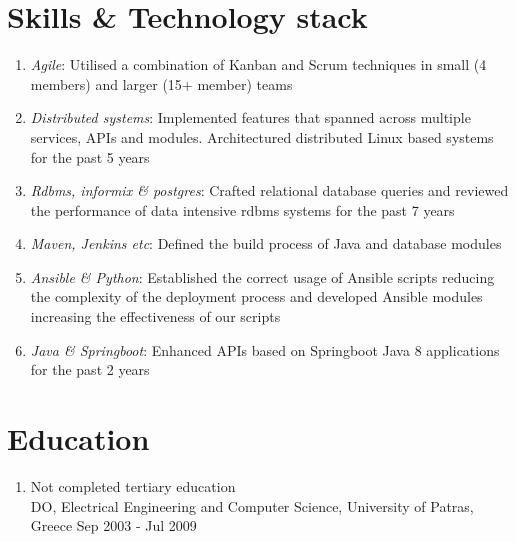 \documentclass{CVSoftwareEngineer}
\begin{document}
	\section{Skills \& Technology stack}
	\begin{enumerate}[labelwidth=!, labelindent=22pt, leftmargin=*, rightmargin=15pt]
		\item[\textasteriskcentered] \textit{Agile}: Utilised a combination of Kanban and Scrum techniques in small (4 members)
			and larger (15+ member) teams
		\item[\textasteriskcentered] \textit{Distributed systems}: Implemented features that spanned across multiple services,
			APIs and modules. Architectured distributed Linux based systems for the past 5 years
		\item[\textasteriskcentered] \textit{Rdbms, informix \& postgres}: Crafted relational database queries and reviewed
			the performance of data intensive rdbms systems for the past 7 years
		\item[\textasteriskcentered] \textit{Maven, Jenkins etc}: Defined the build process of Java and database modules
		\item[\textasteriskcentered] \textit{Ansible \& Python}: Established the correct usage of Ansible scripts reducing the complexity
			of the deployment process and developed Ansible modules increasing the effectiveness of our scripts
		\item[\textasteriskcentered] \textit{Java \& Springboot}: Enhanced APIs based on Springboot Java 8 applications for the past 2 years
	\end{enumerate}

	\section{Education}
	\begin{enumerate}[labelwidth=!, labelindent=0pt, leftmargin=*, rightmargin=15pt]
		\item[] Not completed tertiary education \\
			DO, Electrical Engineering and Computer Science, University of Patras, Greece \hfill {\scriptsize Sep 2003 - Jul 2009}
	\end{enumerate}
\end{document}
